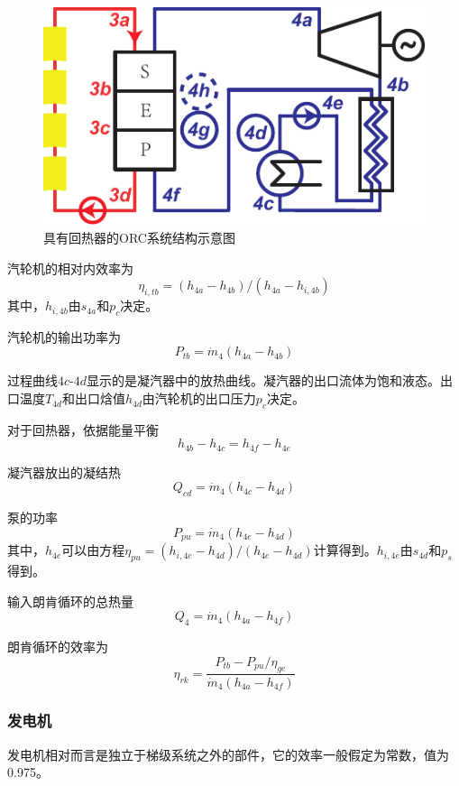 \begin{figure}[htbp]
\centering
	\includegraphics[width = 0.4\columnwidth]{fig/ORCsystem2.pdf}
	\caption{具有回热器的ORC系统结构示意图}
	\label{fig:ORCsystem2}
\end{figure}
汽轮机的相对内效率为
\begin{equation}
  \eta_{i,tb} = (h_{4a}-h_{4b})/(h_{4a}-h_{i,4b})
\end{equation}
其中，$h_{i,4b}$由$s_{4a}$和$p_c$决定。

汽轮机的输出功率为
\begin{equation}
  P_{tb}=\dot{m}_4(h_{4a}-h_{4b})
\end{equation}

过程曲线$4c$-$4d$显示的是凝汽器中的放热曲线。凝汽器的出口流体为饱和液态。出口温度$T_{4d}$和出口焓值$h_{4d}$由汽轮机的出口压力$p_c$决定。

对于回热器，依据能量平衡
\begin{equation}
  h_{4b} - h_{4c} = h_{4f} - h_{4e}
\end{equation}

凝汽器放出的凝结热
\begin{equation}
  Q_{cd} = \dot{m}_4 (h_{4c} - h_{4d})
\end{equation}

泵的功率
\begin{equation}
P_{pu}=\dot{m}_{4}(h_{4e}-h_{4d})
\end{equation}  
其中，$h_{4e}$可以由方程$\eta_{pu} = (h_{i,4e}-h_{4d})/(h_{4e}-h_{4d})$计算得到。$h_{i,4e}$由$s_{4d}$和$p_s$得到。
    
输入朗肯循环的总热量
\begin{equation}
    Q_4=\dot{m}_4(h_{4a}-h_{4f})
\end{equation}

朗肯循环的效率为
\begin{equation}
	\eta_{rk}=\dfrac{P_{tb}-P_{pu}/\eta_{ge}}{\dot{m}_4(h_{4a}-h_{4f})}
\end{equation}

\subsubsection{发电机}
发电机相对而言是独立于梯级系统之外的部件，它的效率一般假定为常数，值为0.975。


